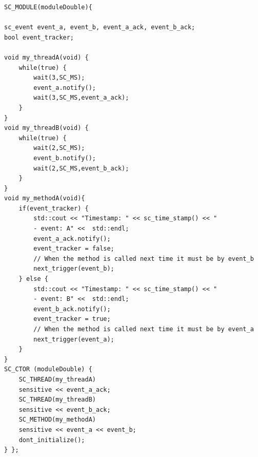 \begin{lstlisting}[style=customc++, caption=Implementation of ModuleDouble,
label={lst:moduledoubleheader}]
SC_MODULE(moduleDouble){

sc_event event_a, event_b, event_a_ack, event_b_ack;
bool event_tracker;

void my_threadA(void) {
	while(true) {
		wait(3,SC_MS);
		event_a.notify();
		wait(3,SC_MS,event_a_ack);
	}
}
void my_threadB(void) {
	while(true) {
		wait(2,SC_MS);
		event_b.notify();
		wait(2,SC_MS,event_b_ack);
	}
}
void my_methodA(void){
	if(event_tracker) {
		std::cout << "Timestamp: " << sc_time_stamp() << "
		- event: A" <<  std::endl;
		event_a_ack.notify();
		event_tracker = false;
		// When the method is called next time it must be by event_b
		next_trigger(event_b);
	} else {
		std::cout << "Timestamp: " << sc_time_stamp() << "
		- event: B" <<  std::endl;
		event_b_ack.notify();
		event_tracker = true;
		// When the method is called next time it must be by event_a
		next_trigger(event_a);
	}
}
SC_CTOR (moduleDouble) {
	SC_THREAD(my_threadA)
	sensitive << event_a_ack;
	SC_THREAD(my_threadB)
	sensitive << event_b_ack;
	SC_METHOD(my_methodA)
	sensitive << event_a << event_b;
	dont_initialize();
} };
\end{lstlisting}